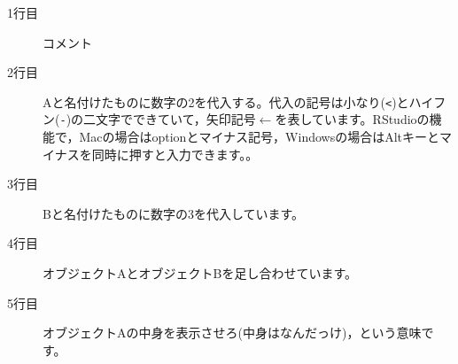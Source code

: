 \begin{description}
	\item[1行目] コメント
	\item[2行目] Aと名付けたものに数字の2を代入する。代入の記号は小なり(\verb|<|)とハイフン(\verb|-|)の二文字でできていて，矢印記号$\leftarrow$を表しています。RStudioの機能で，Macの場合はoptionとマイナス記号，Windowsの場合はAltキーとマイナスを同時に押すと入力できます。。
	\item[3行目] Bと名付けたものに数字の3を代入しています。
	\item[4行目] オブジェクトAとオブジェクトBを足し合わせています。
	\item[5行目] オブジェクトAの中身を表示させろ(中身はなんだっけ)，という意味です。
\end{description}
